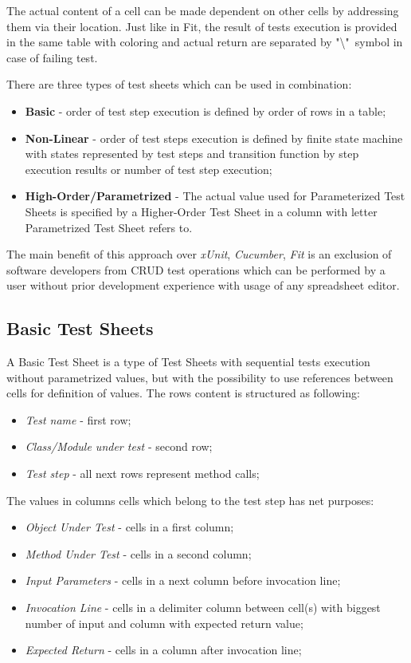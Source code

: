 The actual content of a cell can be made dependent on other cells by addressing them via their location.
Just like in Fit, the result of tests execution is provided in the same table with coloring and actual return are separated by "\textbackslash"\ symbol in case of failing test\cite{tsb}.

There are three types of test sheets which can be used in combination:
\begin{itemize}
	\item \textbf{Basic} - order of test step execution is defined by order of rows in a table;
	\item \textbf{Non-Linear} - order of test steps execution is defined by finite state machine with states represented by test steps and transition function by step execution results or number of test step execution;
	\item \textbf{High-Order/Parametrized} - The actual value used for Parameterized Test Sheets is specified by a Higher-Order Test Sheet in a column with letter Parametrized Test Sheet refers to.
\end{itemize}
The main benefit of this approach over \textit{xUnit}, \textit{Cucumber}, \textit{Fit} is an exclusion of software developers from CRUD test operations which can be performed by a user without prior development experience with usage of any spreadsheet editor.

 \subsection{Basic Test Sheets}
A Basic Test Sheet is a type of Test Sheets with sequential tests execution without parametrized values, but with the possibility to use references between cells for definition of values.
The rows content is structured as following:
\begin{itemize}
	\item \textit{Test name} - first row;
	\item \textit{Class/Module under test} - second row;
	\item \textit{Test step} - all next rows represent method calls;
\end{itemize}

The values in columns cells which belong to the test step has net purposes:
\begin{itemize}
	\item \textit{Object Under Test} - cells in a first column;
	\item \textit{Method Under Test} - cells in a second column;
	\item \textit{Input Parameters} - cells in a next column before invocation line;
	\item \textit{Invocation Line} - cells in a delimiter column between cell(s) with biggest number of input and column with expected return value;
	\item \textit{Expected Return} - cells in a column after invocation line;
\end{itemize}

